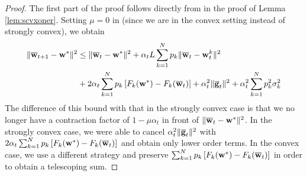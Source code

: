 \begin{proof}
    The first part of the proof follows directly from \eq{\ref{eq:common one step}} in the proof of Lemma \ref{lem:scvxoner}. Setting $\mu=0$ in \eq{\ref{eq:common one step}} (since we are in the convex setting instead of strongly convex), we obtain 
    \begin{align*}
	\|{\overline{\mathbf{w}}}_{t+1}-{\mathbf{w}}^{\ast}\|^{2} & \leq\|{\overline{\mathbf{w}}}_{t}-{\mathbf{w}}^{\ast}\|^{2}+\alpha_{t}L\sum_{k=1}^{N}p_{k}\|{\overline{\mathbf{w}}}_{t}-{\mathbf{w}}_{t}^{k}\|^{2} \\ 
	& +2\alpha_{t}\sum_{k=1}^{N}p_{k}\left[F_{k}({\mathbf{w}}^{\ast})-F_{k}({\overline{\mathbf{w}}}_{t})\right]+\alpha_{t}^{2}\|{\overline{\mathbf{g}}}_{t}\|^{2}+\alpha_{t}^{2}\sum_{k=1}^{N}p_{k}^{2}\sigma_{k}^{2}
	\end{align*}
	The difference of this bound with that in the strongly convex case
	is that we no longer have a contraction factor of $1-\mu\alpha_t$ in front of $\|{\overline{\mathbf{w}}}_{t}-{\mathbf{w}}^{\ast}\|^{2}$.
	In the strongly convex case, we were able to cancel $\alpha_{t}^{2}\|{\overline{\mathbf{g}}}_{t}\|^{2}$
	with $2\alpha_{t}\sum_{k=1}^{N}p_{k}\left[F_{k}({\mathbf{w}}^{\ast})-F_{k}({\overline{\mathbf{w}}}_{t})\right]$
	and obtain only lower order terms. In the convex case, we use a different
	strategy and preserve $\sum_{k=1}^{N}p_{k}\left[F_{k}({\mathbf{w}}^{\ast})-F_{k}({\overline{\mathbf{w}}}_{t})\right]$
	in order to obtain a telescoping sum. 
	

\end{proof}
